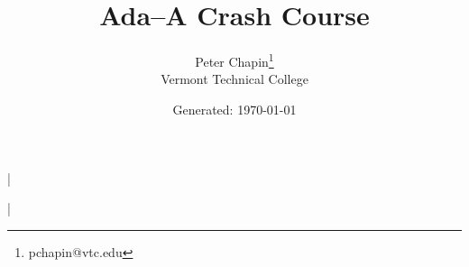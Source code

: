 \documentclass{scrreprt}
\begin{document}
\titlehead{\centering\texttt{[image: Ada-Mascot.pdf]}}
\title{Ada--A Crash Course}
\author{Peter Chapin\thanks{pchapin@vtc.edu}\\
  Vermont Technical College}
\date{Generated: \today}
\maketitle

\tableofcontents

\lstMakeShortInline|




\lstDeleteShortInline|

%
%
%
%
%



\end{document}
